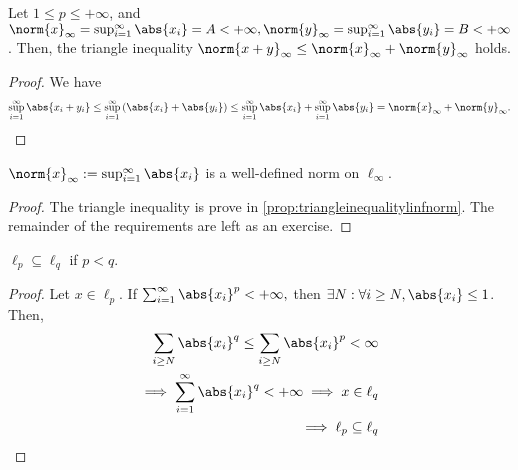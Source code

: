 \begin{proposition}\label{prop:triangleinequalitylinfnorm}
    Let $1 \leq p \leq + \infty$, and $\norm{x}_\infty = \sup_{i=1}^\infty \abs{x_i} = A < + \infty, \norm{y}_\infty = \sup_{i=1}^\infty \abs{y_i} = B < + \infty$. Then, the triangle inequality $\norm{x + y}_\infty \leq \norm{x}_\infty + \norm{y}_\infty$ holds.
\end{proposition}
\begin{proof}
    We have \begin{align*}
        \sup_{i=1}^\infty \abs{x_i + y_i} \leq \sup_{i=1}^\infty \left(\abs{x_i} + \abs{y_i}\right) \leq \sup_{i=1}^\infty \abs{x_i} + \sup_{i=1}^\infty \abs{y_i} = \norm{x}_\infty + \norm{y}_\infty.
    \end{align*}
\end{proof}
\begin{proposition}
    $\norm{x}_\infty := \sup_{i=1}^\infty \abs{x_i}$ is a well-defined norm on $\ell_\infty$.
\end{proposition}
\begin{proof}
    The triangle inequality is prove in \cref{prop:triangleinequalitylinfnorm}. The remainder of the requirements are left as an exercise.
\end{proof}
\begin{proposition}
    $\ell_p \subseteq \ell_q$ if $p < q$.
\end{proposition}
\begin{proof}
    Let $x \in \ell_p$. If $\sum_{i=1}^\infty \abs{x_i}^p < + \infty,$ then $\exists N : \forall i \geq N, \abs{x_i} \leq 1$. Then, \begin{align*}
        \sum_{i \geq N}\abs{x_i}^q \leq \sum_{i\geq N} \abs{x_i}^p < \infty\\
        \implies \sum_{i=1}^\infty \abs{x_i}^q < + \infty \implies x \in \ell_q\\
        \implies \ell_p \subseteq \ell_q
    \end{align*}
\end{proof}